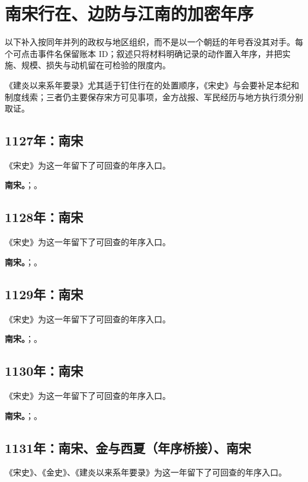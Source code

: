 \section{南宋行在、边防与江南的加密年序}
以下补入按同年并列的政权与地区组织，而不是以一个朝廷的年号吞没其对手。每个可点击事件名保留账本 ID；叙述只将材料明确记录的动作置入年序，并把实施、规模、损失与动机留在可检验的限度内。

《建炎以来系年要录》尤其适于钉住行在的处置顺序，《宋史》与会要补足本纪和制度线索；三者仍主要保存宋方可见事项，金方战报、军民经历与地方执行须分别取证。

\subsection{1127年：南宋}
《宋史》为这一年留下了可回查的年序入口。

\noindent\textbf{南宋。}；。

\subsection{1128年：南宋}
《宋史》为这一年留下了可回查的年序入口。

\noindent\textbf{南宋。}；。

\subsection{1129年：南宋}
《宋史》为这一年留下了可回查的年序入口。

\noindent\textbf{南宋。}；。

\subsection{1130年：南宋}
《宋史》为这一年留下了可回查的年序入口。

\noindent\textbf{南宋。}；。

\subsection{1131年：南宋、金与西夏（年序桥接）、南宋}
《宋史》、《金史》、《建炎以来系年要录》为这一年留下了可回查的年序入口。

